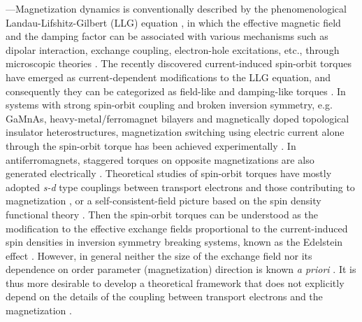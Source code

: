 \documentclass[aps,prb,twocolumn,showpacs,superscriptaddress]{revtex4-1}
\begin{document}
---Magnetization dynamics is conventionally described by the phenomenological Landau-Lifshitz-Gilbert (LLG) equation \cite{landau:1935aa,gilbert:1955aa, *Gilbert2004}, in which the effective magnetic field and the damping factor can be associated with various mechanisms such as dipolar interaction, exchange coupling, electron-hole excitations, etc., through microscopic theories \cite{bland:2005aa,RALPH20081190,garate:2009aa}. The recently discovered current-induced spin-orbit torques have emerged as current-dependent modifications to the LLG equation, and consequently they can be categorized as field-like and damping-like torques \cite{manchon:2008aa,garate:2009aa,Pesin2012,wang2012,Freimuth:2014,KurebayashiH.:2014aa,manchon:2018aa}. In systems with strong spin-orbit coupling and broken inversion symmetry, e.g. GaMnAs, heavy-metal/ferromagnet bilayers and magnetically doped topological insulator heterostructures, magnetization switching using electric current alone through the spin-orbit torque has been achieved experimentally \cite{chernyshov:2009aa, KurebayashiH.:2014aa, Mellnik:2014spin, Fan:2014aa,manchon:2018aa}. In antiferromagnets, staggered torques on opposite magnetizations are also generated electrically \cite{AF_STT,AF_SOT,AF_ST,manchon:2018aa}. Theoretical studies of spin-orbit torques have mostly adopted {\it{s-d}} type couplings between transport electrons and those contributing to magnetization \cite{manchon:2008aa,garate:2009aa,Pesin2012,wang2012,KurebayashiH.:2014aa}, or a self-consistent-field picture based on the spin density functional theory \cite{Freimuth:2014,qian:2002spin}. Then the spin-orbit torques can be understood as the modification to the effective exchange fields proportional to the current-induced spin densities in inversion symmetry breaking systems, known as the Edelstein effect \cite{edelstein:1990spin,garate:2009aa}. However, in general neither the size of the exchange field nor its dependence on order parameter (magnetization) direction is known \textit{a priori} \cite{brataas:2014aa,Hals2013,manchon:2018aa}. It is thus more desirable to develop a theoretical framework that does not explicitly depend on the details of the coupling between transport electrons and the magnetization \cite{Hals2013, symmetry_SOT_bb, symmetry_SOT_cc}.
\end{document}
